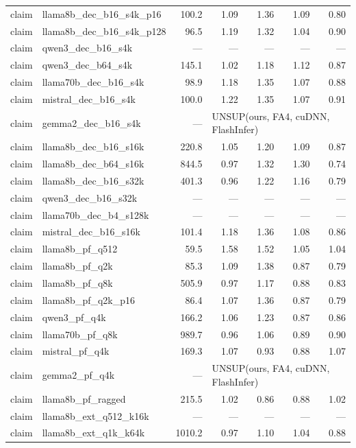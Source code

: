 \begin{longtable}{@{}llrrrrr@{}}
claim & llama8b\_dec\_b16\_s4k\_p16 & 100.2 & 1.09 & 1.36 & 1.09 & 0.80 \\
claim & llama8b\_dec\_b16\_s4k\_p128 & 96.5 & 1.19 & 1.32 & 1.04 & 0.90 \\
claim & qwen3\_dec\_b16\_s4k & --- & --- & --- & --- & --- \\
claim & qwen3\_dec\_b64\_s4k & 145.1 & 1.02 & 1.18 & 1.12 & 0.87 \\
claim & llama70b\_dec\_b16\_s4k & 98.9 & 1.18 & 1.35 & 1.07 & 0.88 \\
claim & mistral\_dec\_b16\_s4k & 100.0 & 1.22 & 1.35 & 1.07 & 0.91 \\
claim & gemma2\_dec\_b16\_s4k & --- & \multicolumn{4}{l}{UNSUP({ours, FA4, cuDNN, FlashInfer})} \\
claim & llama8b\_dec\_b16\_s16k & 220.8 & 1.05 & 1.20 & 1.09 & 0.87 \\
claim & llama8b\_dec\_b64\_s16k & 844.5 & 0.97 & 1.32 & 1.30 & 0.74 \\
claim & llama8b\_dec\_b16\_s32k & 401.3 & 0.96 & 1.22 & 1.16 & 0.79 \\
claim & qwen3\_dec\_b16\_s32k & --- & --- & --- & --- & --- \\
claim & llama70b\_dec\_b4\_s128k & --- & --- & --- & --- & --- \\
claim & mistral\_dec\_b16\_s16k & 101.4 & 1.18 & 1.36 & 1.08 & 0.86 \\
claim & llama8b\_pf\_q512 & 59.5 & 1.58 & 1.52 & 1.05 & 1.04 \\
claim & llama8b\_pf\_q2k & 85.3 & 1.09 & 1.38 & 0.87 & 0.79 \\
claim & llama8b\_pf\_q8k & 505.9 & 0.97 & 1.17 & 0.88 & 0.83 \\
claim & llama8b\_pf\_q2k\_p16 & 86.4 & 1.07 & 1.36 & 0.87 & 0.79 \\
claim & qwen3\_pf\_q4k & 166.2 & 1.06 & 1.23 & 0.87 & 0.86 \\
claim & llama70b\_pf\_q8k & 989.7 & 0.96 & 1.06 & 0.89 & 0.90 \\
claim & mistral\_pf\_q4k & 169.3 & 1.07 & 0.93 & 0.88 & 1.07 \\
claim & gemma2\_pf\_q4k & --- & \multicolumn{4}{l}{UNSUP({ours, FA4, cuDNN, FlashInfer})} \\
claim & llama8b\_pf\_ragged & 215.5 & 1.02 & 0.86 & 0.88 & 1.02 \\
claim & llama8b\_ext\_q512\_k16k & --- & --- & --- & --- & --- \\
claim & llama8b\_ext\_q1k\_k64k & 1010.2 & 0.97 & 1.10 & 1.04 & 0.88 \\

\end{longtable}

